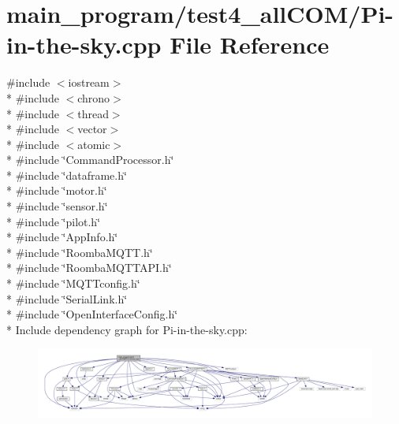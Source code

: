 \hypertarget{test4__all_c_o_m_2_pi-in-the-sky_8cpp}{}\section{main\+\_\+program/test4\+\_\+all\+C\+O\+M/\+Pi-\/in-\/the-\/sky.cpp File Reference}
\label{test4__all_c_o_m_2_pi-in-the-sky_8cpp}
{\ttfamily \#include $<$iostream$>$}\\*
{\ttfamily \#include $<$chrono$>$}\\*
{\ttfamily \#include $<$thread$>$}\\*
{\ttfamily \#include $<$vector$>$}\\*
{\ttfamily \#include $<$atomic$>$}\\*
{\ttfamily \#include \char`\"{}Command\+Processor.\+h\char`\"{}}\\*
{\ttfamily \#include \char`\"{}dataframe.\+h\char`\"{}}\\*
{\ttfamily \#include \char`\"{}motor.\+h\char`\"{}}\\*
{\ttfamily \#include \char`\"{}sensor.\+h\char`\"{}}\\*
{\ttfamily \#include \char`\"{}pilot.\+h\char`\"{}}\\*
{\ttfamily \#include \char`\"{}App\+Info.\+h\char`\"{}}\\*
{\ttfamily \#include \char`\"{}Roomba\+M\+Q\+T\+T.\+h\char`\"{}}\\*
{\ttfamily \#include \char`\"{}Roomba\+M\+Q\+T\+T\+A\+P\+I.\+h\char`\"{}}\\*
{\ttfamily \#include \char`\"{}M\+Q\+T\+Tconfig.\+h\char`\"{}}\\*
{\ttfamily \#include \char`\"{}Serial\+Link.\+h\char`\"{}}\\*
{\ttfamily \#include \char`\"{}Open\+Interface\+Config.\+h\char`\"{}}\\*
Include dependency graph for Pi-\/in-\/the-\/sky.cpp\+:
\nopagebreak
\begin{figure}[H]
\begin{center}
\leavevmode
\includegraphics[width=350pt]{test4__all_c_o_m_2_pi-in-the-sky_8cpp__incl}
\end{center}
\end{figure}
